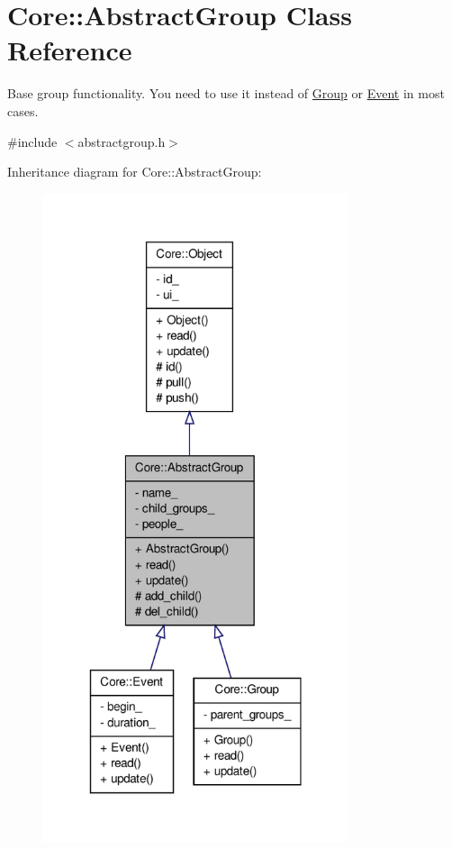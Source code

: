 \hypertarget{classCore_1_1AbstractGroup}{
\section{Core::AbstractGroup Class Reference}
\label{dd/d68/classCore_1_1AbstractGroup}
}


Base group functionality. You need to use it instead of \hyperlink{classCore_1_1Group}{Group} or \hyperlink{classCore_1_1Event}{Event} in most cases.  




{\ttfamily \#include $<$abstractgroup.h$>$}



Inheritance diagram for Core::AbstractGroup:
\nopagebreak
\begin{figure}[H]
\begin{center}
\leavevmode
\includegraphics[width=254pt]{d2/d03/classCore_1_1AbstractGroup__inherit__graph}
\end{center}
\end{figure}


